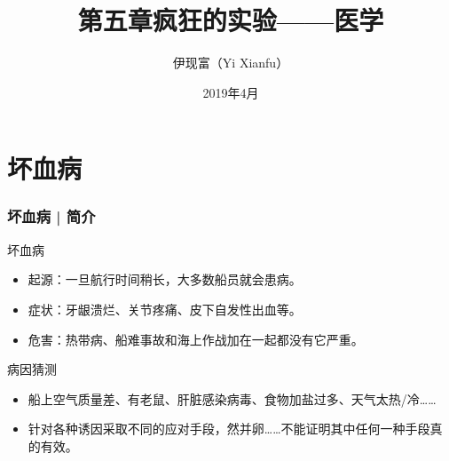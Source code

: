 



\title[医学]{第五章\quad 疯狂的实验——医学}
\author[Yixf]{伊现富（Yi Xianfu）}
\date{2019年4月}




\section{坏血病}
\begin{frame}
  \frametitle{坏血病 | 简介}
  \begin{block}{坏血病}
    \begin{itemize}
      \item 起源：一旦航行时间稍长，大多数船员就会患病。
      \item 症状：牙龈溃烂、关节疼痛、皮下自发性出血等。
      \item 危害：热带病、船难事故和海上作战加在一起都没有它严重。
    \end{itemize}
  \end{block}
  \pause
  \begin{block}{病因猜测}
    \begin{itemize}
      \item 船上空气质量差、有老鼠、肝脏感染病毒、食物加盐过多、天气太热/冷……
      \item 针对各种诱因采取不同的应对手段，然并卵……不能证明其中任何一种手段真的有效。
    \end{itemize}
  \end{block}
\end{frame}


